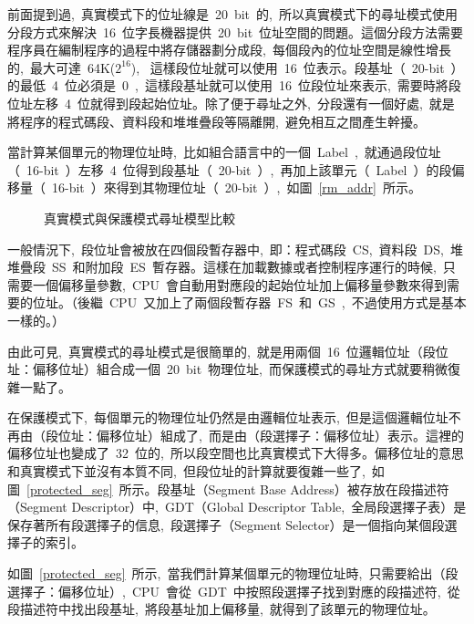 前面提到過,~真實模式下的位址線是~20~bit~的,~所以真實模式下的尋址模式使用分段方式來解決~16~位字長機器提供~20~bit~位址空間的問題。這個分段方法需要程序員在編制程序的過程中將存儲器劃分成段,~每個段內的位址空間是線性增長的,~最大可達~64K($2^16$),~
這樣段位址就可以使用~16~位表示。段基址（~20-bit~）的最低~4~位必須是~0~,~這樣段基址就可以使用~16~位段位址來表示,~需要時將段位址左移~4~位就得到段起始位址。除了便于尋址之外,~分段還有一個好處,~就是將程序的程式碼段、資料段和堆堆疊段等隔離開,~避免相互之間產生幹擾。

當計算某個單元的物理位址時,~比如組合語言中的一個~Label~,~就通過段位址（~16-bit~）左移~4~位得到段基址（~20-bit~）,~再加上該單元（~Label~）的段偏移量（~16-bit~）來得到其物理位址（~20-bit~）,~如圖~\ref{rm_addr}~所示。

\begin{figure*}[!t]
\centerline{
\hfil
{}}
\caption{真實模式與保護模式尋址模型比較}
\label{real_vs_pro}
\end{figure*}

一般情況下,~段位址會被放在四個段暫存器中,~即：程式碼段~CS,~資料段~DS,~堆堆疊段~SS~和附加段~ES~暫存器。這樣在加載數據或者控制程序運行的時候,~只需要一個偏移量參數,~CPU~會自動用對應段的起始位址加上偏移量參數來得到需要的位址。（後繼~CPU~又加上了兩個段暫存器~FS~和~GS~,~不過使用方式是基本一樣的。）

由此可見,~真實模式的尋址模式是很簡單的,~就是用兩個~16~位邏輯位址（段位址：偏移位址）組合成一個~20~bit~物理位址,~而保護模式的尋址方式就要稍微復雜一點了。


在保護模式下,~每個單元的物理位址仍然是由邏輯位址表示,~但是這個邏輯位址不再由（段位址：偏移位址）組成了,~而是由（段選擇子：偏移位址）表示。這裡的偏移位址也變成了~32~位的,~所以段空間也比真實模式下大得多。偏移位址的意思和真實模式下並沒有本質不同,~但段位址的計算就要復雜一些了,~如圖~\ref{protected_seg}~所示。段基址（Segment Base Address）被存放在段描述符（Segment Descriptor）中,~GDT（Global Descriptor Table,~全局段選擇子表）是保存著所有段選擇子的信息,~段選擇子（Segment Selector）是一個指向某個段選擇子的索引。

如圖~\ref{protected_seg}~所示,~當我們計算某個單元的物理位址時,~只需要給出（段選擇子：偏移位址）,~CPU~會從~GDT~中按照段選擇子找到對應的段描述符,~從段描述符中找出段基址,~將段基址加上偏移量,~就得到了該單元的物理位址。

